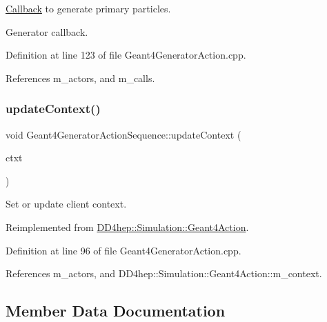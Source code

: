 \hyperlink{class_d_d4hep_1_1_callback}{Callback} to generate primary particles. 

Generator callback. 

Definition at line 123 of file Geant4\+Generator\+Action.\+cpp.



References m\+\_\+actors, and m\+\_\+calls.

\hypertarget{class_d_d4hep_1_1_simulation_1_1_geant4_generator_action_sequence_a52b0d18dd3c29e1b1e133d9e1c73284b}{}\label{class_d_d4hep_1_1_simulation_1_1_geant4_generator_action_sequence_a52b0d18dd3c29e1b1e133d9e1c73284b} 
\subsubsection{\texorpdfstring{update\+Context()}{updateContext()}}
{\footnotesize\ttfamily void Geant4\+Generator\+Action\+Sequence\+::update\+Context (\begin{DoxyParamCaption}\item[{\hyperlink{class_d_d4hep_1_1_simulation_1_1_geant4_context}{Geant4\+Context} $\ast$}]{ctxt }\end{DoxyParamCaption})\hspace{0.3cm}{\ttfamily [virtual]}}



Set or update client context. 



Reimplemented from \hyperlink{class_d_d4hep_1_1_simulation_1_1_geant4_action_ae3b9daf2af881df956c46568c0743313}{D\+D4hep\+::\+Simulation\+::\+Geant4\+Action}.



Definition at line 96 of file Geant4\+Generator\+Action.\+cpp.



References m\+\_\+actors, and D\+D4hep\+::\+Simulation\+::\+Geant4\+Action\+::m\+\_\+context.



\subsection{Member Data Documentation}
\hypertarget{class_d_d4hep_1_1_simulation_1_1_geant4_generator_action_sequence_a89614165b2d4cf32bbed637abca203d1}{}\label{class_d_d4hep_1_1_simulation_1_1_geant4_generator_action_sequence_a89614165b2d4cf32bbed637abca203d1} 
